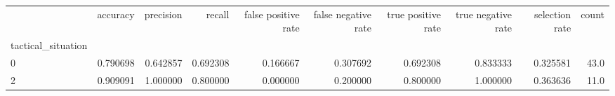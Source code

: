\begin{tabular}{lrrrrrrrrr}
\toprule
{} &  accuracy &  precision &    recall &  false positive rate &  false negative rate &  true positive rate &  true negative rate &  selection rate &  count \\
tactical\_situation &           &            &           &                      &                      &                     &                     &                 &        \\
\midrule
0                  &  0.790698 &   0.642857 &  0.692308 &             0.166667 &             0.307692 &            0.692308 &            0.833333 &        0.325581 &   43.0 \\
2                  &  0.909091 &   1.000000 &  0.800000 &             0.000000 &             0.200000 &            0.800000 &            1.000000 &        0.363636 &   11.0 \\
\bottomrule
\end{tabular}
